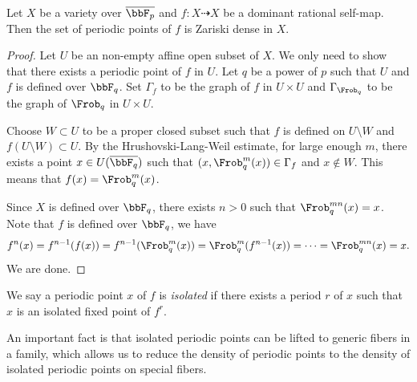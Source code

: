 \begin{lemma}\label{lem:density_of_periodic_points_over_finite_fields}
	Let $X$ be a variety over $\overline{\bbF_p}$ and $f: X \dashrightarrow X$ be a dominant rational self-map.
	Then the set of periodic points of $f$ is Zariski dense in $X$.
\end{lemma}
\begin{proof}
	Let $U$ be an non-empty affine open subset of $X$.
	We only need to show that there exists a periodic point of $f$ in $U$.
	Let $q$ be a power of $p$ such that $U$ and $f$ is defined over $\bbF_q$.
	Set $\Gamma_f$ to be the graph of $f$ in $U \times U$ and $\Gamma_{\Frob_q}$ to be the graph of $\Frob_q$ in $U \times U$.

	Choose $W \subset U$ to be a proper closed subset such that $f$ is defined on $U \setminus W$ and $f(U \setminus W) \subset U$.
	By the Hrushovski-Lang-Weil estimate, for large enough $m$, there exists a point $x \in U(\overline{\bbF_q})$ such that $(x, \Frob_q^m(x)) \in \Gamma_f$ and $x \notin W$.
	This means that $f(x) = \Frob_q^m(x)$.

	Since $X$ is defined over $\bbF_q$, there exists $n > 0$ such that $\Frob_q^{mn}(x) = x$.
	Note that $f$ is defined over $\bbF_q$, we have
	\[ f^n(x) = f^{n-1}(f(x)) = f^{n-1}(\Frob_q^m(x)) = \Frob_q^m(f^{n-1}(x)) = \cdots = \Frob_q^{mn}(x) = x. \]
	We are done.
\end{proof}

\begin{definition}
	We say a periodic point $x$ of $f$ is \emph{isolated} if there exists a period $r$ of $x$ such that $x$ is an isolated fixed point of $f^r$.
\end{definition}

An important fact is that isolated periodic points can be lifted to generic fibers in a family, which allows us to reduce the density of periodic points to the density of isolated periodic points on special fibers.

